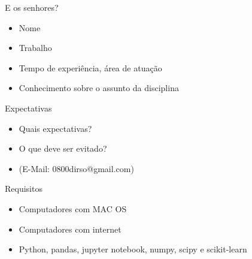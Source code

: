 \begin{frame}	
	\begin{block}{E os senhores?}
		\begin{itemize}
			\item Nome
			\item Trabalho
			\item Tempo de experiência, área de atuação
			\item Conhecimento sobre o assunto da disciplina
		\end{itemize}
	\end{block}
\end{frame}

\begin{frame}	
	\begin{block}{Expectativas}
		\begin{itemize}
			\item Quais expectativas?
			\item O que deve ser evitado?
			\item (E-Mail: 0800dirso@gmail.com)
		\end{itemize}
	\end{block}
\end{frame}

\begin{frame}	
	\begin{block}{Requisitos}
		\begin{itemize}
			\item Computadores com MAC OS
			\item Computadores com internet
			\item Python, pandas, jupyter notebook, numpy, scipy e scikit-learn
		\end{itemize}
	\end{block}
\end{frame}